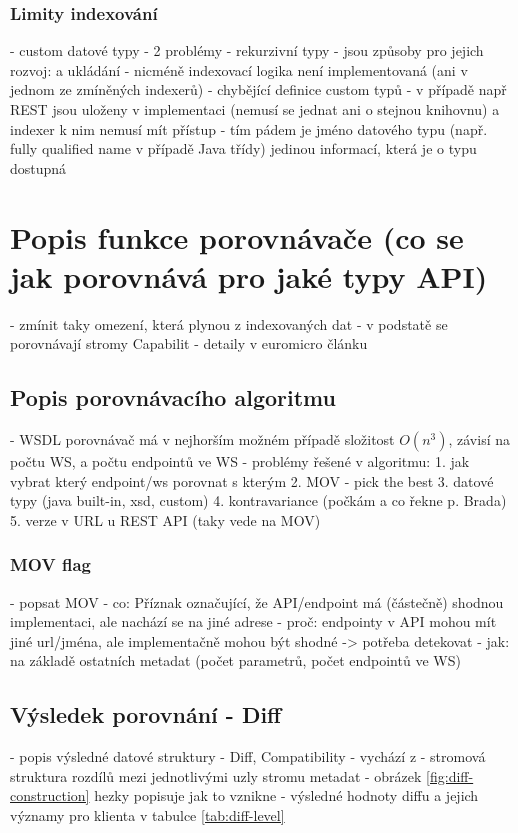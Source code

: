 \documentclass[czech,DP]{thesiskiv}
\begin{document}
\subsection{Limity indexování}

 - custom datové typy
 - 2 problémy
	- rekurzivní typy
		- jsou způsoby pro jejich rozvoj: \cite{abadi1995subytping} a ukládání
		- nicméně indexovací logika není implementovaná (ani v jednom ze zmíněných indexerů)
	- chybějící definice custom typů
		- v případě např REST jsou uloženy v implementaci (nemusí se jednat ani o stejnou knihovnu) a indexer k nim nemusí mít přístup
		- tím pádem je jméno datového typu (např. fully qualified name v případě Java třídy) jedinou informací, která je o typu dostupná

\chapter{Popis funkce porovnávače (co se jak porovnává pro jaké typy API)}

- zmínit taky omezení, která plynou z indexovaných dat
- v podstatě se porovnávají stromy Capabilit
- detaily v euromicro článku

\section{Popis porovnávacího algoritmu}
- WSDL porovnávač má v nejhorším možném případě složitost $O(n^3)$, závisí na počtu WS, a počtu endpointů ve WS 
- problémy řešené v algoritmu:
	1. jak vybrat který endpoint/ws porovnat s kterým
	2. MOV - pick the best
	3. datové typy (java built-in, xsd, custom)
	4. kontravariance (počkám a co řekne p. Brada)
	5. verze v URL u REST API (taky vede na MOV)
	
\subsection{MOV flag}	

- popsat MOV
- co: Příznak označující, že API/endpoint má (částečně) shodnou implementaci, ale nachází se na jiné adrese
- proč: endpointy v API mohou mít jiné url/jména, ale implementačně mohou být shodné -> potřeba detekovat
- jak: na základě ostatních metadat (počet parametrů, počet endpointů ve WS)
	
\section{Výsledek porovnání - Diff}	
- popis výsledné datové struktury
	- Diff, Compatibility
	- vychází z \cite{brada2006diff}
	- stromová struktura rozdílů mezi jednotlivými uzly stromu metadat
	- obrázek \ref{fig:diff-construction} hezky popisuje jak to vznikne
	- výsledné hodnoty diffu a jejich významy pro klienta v tabulce \ref{tab:diff-level}
	
\end{document}
